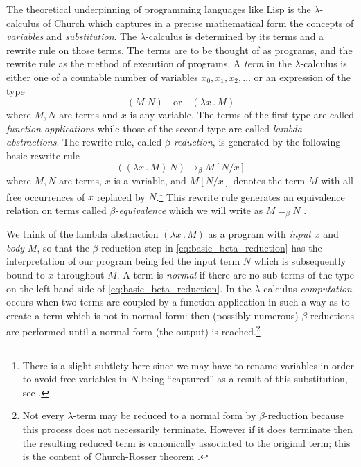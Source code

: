 \documentclass[english,letter paper,12pt,reqno]{article}
\theoremstyle{example}
\numberwithin{equation}{section}
\begin{document}
The theoretical underpinning of programming languages like Lisp \cite{mccarthy} is the $\lambda$-calculus of Church \cite{church,selinger} which captures in a precise mathematical form the concepts of \emph{variables} and \emph{substitution}. The $\lambda$-calculus is determined by its terms and a rewrite rule on those terms. The terms are to be thought of as programs, and the rewrite rule as the method of execution of programs. A \emph{term} in the $\lambda$-calculus is either one of a countable number of variables $x_0,x_1,x_2,\ldots$ or an expression of the type
\begin{equation}
(M \; N) \quad \text{or} \quad (\lambda x\,.\, M)
\end{equation}
where $M,N$ are terms and $x$ is any variable. The terms of the first type are called \emph{function applications} while those of the second type are called \emph{lambda abstractions}. The rewrite rule, called \emph{$\beta$-reduction}, is generated by the following basic rewrite rule
\begin{equation}\label{eq:basic_beta_reduction}
( (\lambda x \,.\, M)\, N) \longrightarrow_\beta M[N/x]
\end{equation}
where $M,N$ are terms, $x$ is a variable, and $M[N/x]$ denotes the term $M$ with all free occurrences of $x$ replaced by $N$.\footnote{There is a slight subtlety here since we may have to rename variables in order to avoid free variables in $N$ being ``captured'' as a result of this substitution, see \cite[\S 2.3]{selinger}.} This rewrite rule generates an equivalence relation on terms called \emph{$\beta$-equivalence} which we will write as $M =_{\beta} N$ \cite[\S 2.5]{selinger}.

We think of the lambda abstraction $(\lambda x \,.\, M)$ as a program with \emph{input} $x$ and \emph{body} $M$, so that the $\beta$-reduction step in \eqref{eq:basic_beta_reduction} has the interpretation of our program being fed the input term $N$ which is subsequently bound to $x$ throughout $M$. A term is \emph{normal} if there are no sub-terms of the type on the left hand side of \eqref{eq:basic_beta_reduction}. In the $\lambda$-calculus \emph{computation} occurs when two terms are coupled by a function application in such a way as to create a term which is not in normal form: then (possibly numerous) $\beta$-reductions are performed until a normal form (the output) is reached.\footnote{Not every $\lambda$-term may be reduced to a normal form by $\beta$-reduction because this process does not necessarily terminate. However if it does terminate then the resulting reduced term is canonically associated to the original term; this is the content of Church-Rosser theorem \cite[\S 4.2]{selinger}.}
\end{document}
